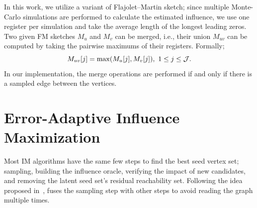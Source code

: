 In this work, we utilize a variant of Flajolet–Martin sketch; since multiple Monte-Carlo simulations are performed to calculate the estimated influence, we use one register per simulation and take the average length of the longest leading zeros. Two given FM sketches $M_u$ and $M_v$ can be merged, i.e., their union $M_{uv}$ can be computed by taking the pairwise maximums of their registers. Formally; 
\begin{equation}
\label{eq:sketch-merge}
    M_{uv}[j] = \max(M_u[j], M_v[j]),~1 \leq j \leq {\cal J}.
\end{equation} 
In our implementation, the merge operations are performed if and only if there is a sampled edge between the vertices. %


\section{Error-Adaptive Influence Maximization}\label{sec:method}

Most IM algorithms have the same few steps to find the best seed vertex set; sampling, building the influence oracle, verifying the impact of new candidates, and removing the latent seed set's residual reachability set. Following the idea proposed in~\cite{infuser}, \acro fuses the sampling step with other steps to avoid reading the graph multiple times. 

